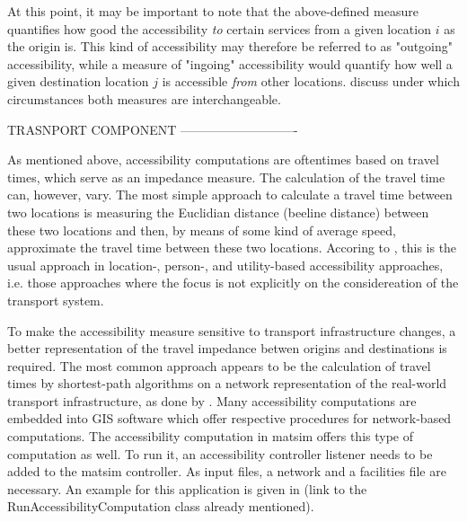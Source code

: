 At this point, it may be important to note that the above-defined measure quantifies how good the accessibility \textit{to} certain services from a given location $i$ as the origin is. This kind of accessibility may therefore be referred to as "outgoing" accessibility, while a measure of "ingoing" accessibility would quantify how well a given destination location $j$ is accessible \textit{from} other locations. \citet{NicolaiNagel2012HiResAccessibilityMethodInBook} discuss under which circumstances both measures are interchangeable.

TRASNPORT COMPONENT ----------------------------


As mentioned above, accessibility computations are oftentimes based on travel times, which serve as an impedance measure. The calculation of the travel time can, however, vary. The most simple approach to calculate a travel time between two locations is measuring the Euclidian distance (beeline distance) between these two locations and then, by means of some kind of average speed, approximate the travel time between these two locations. Accoring to \citet{Geurs2004AccessibilityReview}, this is the usual approach in location-, person-, and utility-based accessibility approaches, i.e. those approaches where the focus is not explicitly on the considereation of the transport system.

To make the accessibility measure sensitive to transport infrastructure changes, a better representation of the travel impedance betwen origins and destinations is required. The most common approach appears to be the calculation of travel times by shortest-path algorithms on a network representation of the real-world transport infrastructure, as \eg done by \citet{BBSR20xxErreichbarkeitsmodell}.
Many accessibility computations are embedded into GIS software which offer respective procedures for network-based computations. The accessibility computation in \gls{matsim} offers this type of computation as well. To run it, an accessibility controller listener needs to be added to the \gls{matsim} controller. As input files, a network and a facilities file are necessary. An example for this application is given in (link to the RunAccessibilityComputation class already mentioned).

